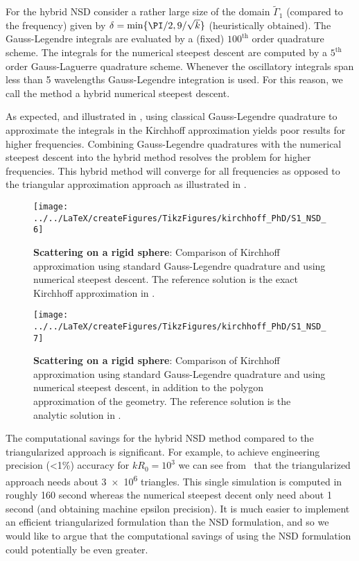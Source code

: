 For the hybrid NSD consider a rather large size of the domain $\tilde{\Gamma}_1$ (compared to the frequency) given by ${\delta = \min\{\PI/2,9/\sqrt{k}\}}$ (heuristically obtained). The Gauss-Legendre integrals are evaluated by a (fixed) $100^{\mathrm{th}}$ order quadrature scheme. The integrals for the numerical steepest descent are computed by a $5^{\mathrm{th}}$ order Gauss-Laguerre quadrature scheme. Whenever the oscillatory integrals span less than 5 wavelengths Gauss-Legendre integration is used. For this reason, we call the method a hybrid numerical steepest descent.

As expected, and illustrated in , using classical Gauss-Legendre quadrature to approximate the integrals in the Kirchhoff approximation yields poor results for higher frequencies. Combining Gauss-Legendre quadratures with the numerical steepest descent into the hybrid method resolves the problem for higher frequencies. This hybrid method will converge for all frequencies as opposed to the triangular approximation approach as illustrated in .

\begin{figure}
	\centering
	\texttt{[image: ../../LaTeX/createFigures/TikzFigures/kirchhoff\_PhD/S1\_NSD\_6]}
	\caption{\textbf{Scattering on a rigid sphere}: Comparison of Kirchhoff approximation using standard Gauss-Legendre quadrature and using numerical steepest descent. The reference solution is the exact Kirchhoff approximation in .}
	\label{Fig4:gaussVSnsd}
\end{figure}
\begin{figure}
	\centering
	\texttt{[image: ../../LaTeX/createFigures/TikzFigures/kirchhoff\_PhD/S1\_NSD\_7]}
	\caption{\textbf{Scattering on a rigid sphere}: Comparison of Kirchhoff approximation using standard Gauss-Legendre quadrature and using numerical steepest descent, in addition to the polygon approximation of the geometry. The reference solution is the analytic solution in .}
	\label{Fig4:gaussVSnsd2}
\end{figure}

The computational savings for the hybrid NSD method compared to the triangularized approach is significant. For example, to achieve engineering precision (\textless 1\%) accuracy for $kR_0=10^3$ we can see from~ that the triangularized approach needs about \num{3e6} triangles. This single simulation is computed in roughly 160 second whereas the numerical steepest decent only need about 1 second (and obtaining machine epsilon precision). It is much easier to implement an efficient triangularized formulation than the NSD formulation, and so we would like to argue that the computational savings of using the NSD formulation could potentially be even greater.

